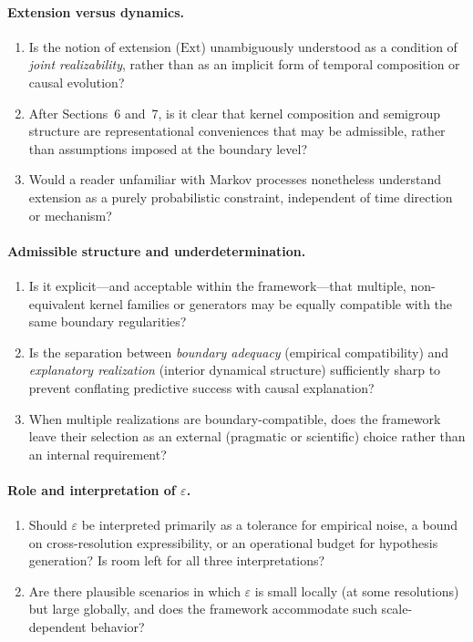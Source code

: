 \documentclass[11pt]{article}
\newcommand{\Ext}{\mathrm{Ext}} 	%
\begin{document}
\paragraph{Extension versus dynamics.}
\begin{enumerate}
  \item Is the notion of extension (\(\Ext\)) unambiguously understood as a condition of
  \emph{joint realizability}, rather than as an implicit form of temporal composition or causal
  evolution?

  \item After Sections~6 and~7, is it clear that kernel composition and semigroup structure are
  representational conveniences that may be admissible, rather than assumptions imposed at the
  boundary level?

  \item Would a reader unfamiliar with Markov processes nonetheless understand extension as a
  purely probabilistic constraint, independent of time direction or mechanism?
\end{enumerate}

\paragraph{Admissible structure and underdetermination.}
\begin{enumerate}
  \item Is it explicit---and acceptable within the framework---that multiple, non-equivalent kernel
  families or generators may be equally compatible with the same boundary regularities?

  \item Is the separation between \emph{boundary adequacy} (empirical compatibility) and
  \emph{explanatory realization} (interior dynamical structure) sufficiently sharp to prevent
  conflating predictive success with causal explanation?

  \item When multiple realizations are boundary-compatible, does the framework leave their
  selection as an external (pragmatic or scientific) choice rather than an internal requirement?
\end{enumerate}

\paragraph{Role and interpretation of \(\varepsilon\).}
\begin{enumerate}
  \item Should \(\varepsilon\) be interpreted primarily as a tolerance for empirical noise, a bound
  on cross-resolution expressibility, or an operational budget for hypothesis generation? Is room
  left for all three interpretations?

  \item Are there plausible scenarios in which \(\varepsilon\) is small locally (at some resolutions)
  but large globally, and does the framework accommodate such scale-dependent behavior?
\end{enumerate}
\end{document}
